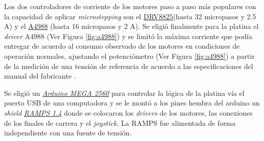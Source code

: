 Los dos controladores de corriente de los motores paso a paso más populares con la capacidad de aplicar \textit{microstepping} son el \href{https://www.pololu.com/product/2133}{DRV8825}(hasta 32 micropasos y 2.5 A) y el \href{https://www.pololu.com/product/1182}{A4988} (hasta 16 micropasos y 2 A). Se eligió finalmente para la platina el \textit{driver} A4988 (Ver Figura \ref{fig:a4988}) y se limitó la máxima corriente que podía entregar de acuerdo al consumo observado de los motores en condiciones de operación normales, ajustando el potenciómetro (Ver Figura \ref{fig:a4988}) a partir de la medición de una tensión de referencia de acuerdo a las especificaciones del manual del fabricante \cite{a4988}.

Se eligió un \href{https://store.arduino.cc/usa/mega-2560-r3}{\textit{Arduino MEGA 2560}} para controlar la lógica de la platina vía el puerto USB de una computadora y se le montó a los pines hembra del arduino un \textit{shield} \href{https://reprap.org/wiki/RAMPS_1.4}{\textit{RAMPS 1.4}} donde se colocaron los \textit{drivers} de los motores, las conexiones de los finales de carrera y el \textit{joystick}. La RAMPS fue alimentada de forma independiente con una fuente de tensión.

